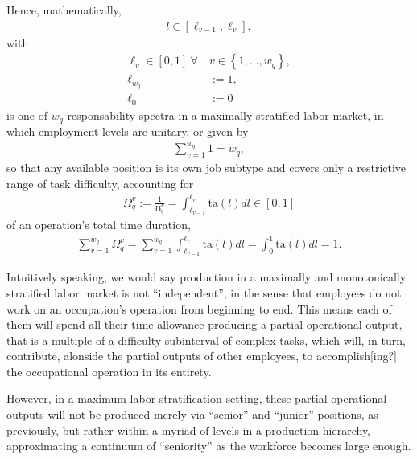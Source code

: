 \documentclass[hidelinks, nonatbib]{elsarticle}
\begin{document}
\begin{definition}
    \label{mmls_def}
    Hence, mathematically,
    \begin{gather}
    l \in \left[
    \ell_{v-1}
    ,
    \ell_{v}
    \right]
    ,
    \end{gather}
    with
    \begin{align}
    \ell_{v} \in [0,1]
    \
    \forall
    \
    &v \in 
    \left\{
        1, \dots, w_q
    \right\}
    ,
    \\
    \ell_{w_q} &:= 1
    ,
    \\
    \ell_0 &:= 0
    \end{align}
    is one of $w_q$ responsability spectra in a maximally stratified labor market, in which employment levels are unitary, or given by
    \begin{gather}
    \sum_{v=1}^{w_q}
    1
    =
    w_q
    ,
    \end{gather}
    so that any available position is its own job subtype and covers only a restrictive range of task difficulty, accounting for
    \begin{gather}
    \Omega_{q}^{v} := 
    \frac{1}{\mho_{q}^{v}} = 
    \int_{
        \ell_{v-1}
    }^{
        \ell_{v}
    }
    \text{ta}(l)dl
    \in [0,1]
    \end{gather}
    of an operation's total time duration,
    \begin{gather}
    \sum_{v=1}^{w_q}
    \Omega_{q}^{v} 
    = 
    \sum_{v=1}^{w_q}
    \int_{
        \ell_{v-1}
    }^{
        \ell_{v}
    }
    \text{ta}(l)dl
    =
    \int_{0}^{1}
    \text{ta}(l)dl
    =
    1
    .
    \end{gather}
    
    Intuitively speaking, we would say production in a maximally and monotonically stratified labor market is not ``independent'', in the sense that employees do not work on an occupation's operation from beginning to end. This means each of them will spend all their time allowance producing a partial operational output, that is a multiple of a difficulty subinterval of complex tasks, which will, in turn, contribute, alonside the partial outputs of other employees, to accomplish[ing?] the occupational operation in its entirety.
    
    However, in a maximum labor stratification setting, these partial operational outputs will not be produced merely via ``senior'' and ``junior'' positions, as previously, but rather within a myriad of levels in a production hierarchy, approximating a continuum of ``seniority'' as the workforce becomes large enough.
    

\end{definition}
\end{document}
